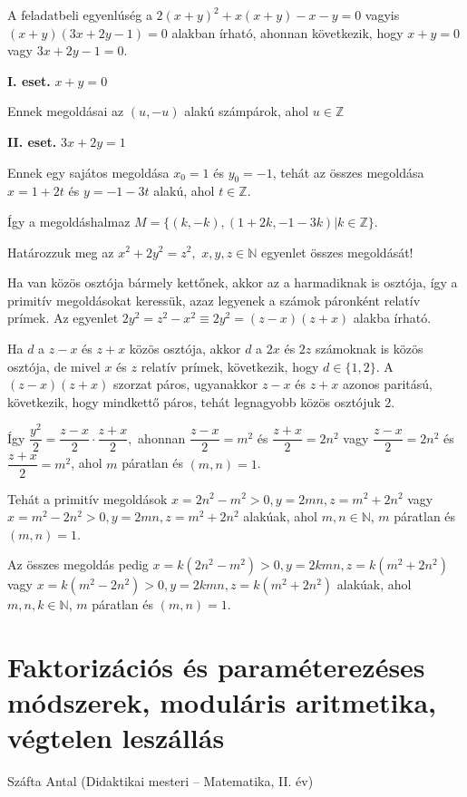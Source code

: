 \begin{solution}
A feladatbeli egyenlúség a $2(x+y)^{2}+x(x+y)-x-y=0$ vagyis $(x+y)(3x+2y-1)=0$
alakban írható, ahonnan következik, hogy $x+y=0$ vagy $3x+2y-1=0.$

\textbf{I. eset.} $x+y=0$

Ennek megoldásai az $(u,-u)$ alakú számpárok, ahol $u\in\mathbb{Z}$

\textbf{II. eset.} $3x+2y=1$

Ennek egy sajátos megoldása $x_{0}=1$ és $y_{0}=-1$, tehát az összes
megoldása $x=1+2t$ és $y=-1-3t$ alakú, ahol $t\in\mathbb{Z}.$

Így a megoldáshalmaz $M=\{(k,-k),(1+2k,-1-3k)|k\in\mathbb{Z}\}.$
\end{solution}
\begin{extraproblem}
Határozzuk meg az $x^{2}+2y^{2}=z^{2},$ $x,y,z\in\mathbb{N}$ egyenlet
összes megoldását! 
\end{extraproblem}

\begin{solution}
Ha van közös osztója bármely kettőnek, akkor az a harmadiknak is osztója,
így a primitív megoldásokat keressük, azaz legyenek a számok páronként
relatív prímek. Az egyenlet $2y^{2}=z^{2}-x^{2}\equiv2y^{2}=(z-x)(z+x)$
alakba írható.

Ha $d$ a $z-x$ és $z+x$ közös osztója, akkor $d$ a $2x$ és $2z$
számoknak is közös osztója, de mivel $x$ és $z$ relatív prímek,
következik, hogy $d\in\{1,2\}$. A $(z-x)(z+x)$ szorzat páros, ugyanakkor
$z-x$ és $z+x$ azonos paritású, következik, hogy mindkettő páros,
tehát legnagyobb közös osztójuk 2.

Így $\dfrac{y^{2}}{2}=\dfrac{z-x}{2}\cdot\dfrac{z+x}{2},$ ahonnan
$\dfrac{z-x}{2}=m^{2}$ és $\dfrac{z+x}{2}=2n^{2}$ vagy $\dfrac{z-x}{2}=2n^{2}$
és $\dfrac{z+x}{2}=m^{2}$, ahol $m$ páratlan és $(m,n)=1$.

Tehát a primitív megoldások $x=2n^{2}-m^{2}>0,y=2mn,z=m^{2}+2n^{2}$
vagy $x=m^{2}-2n^{2}>0,y=2mn,z=m^{2}+2n^{2}$ alakúak, ahol $m,n\in\mathbb{N}$,
$m$ páratlan és $(m,n)=1$.

Az összes megoldás pedig $x=k(2n^{2}-m^{2})>0,y=2kmn,z=k(m^{2}+2n^{2})$
vagy $x=k(m^{2}-2n^{2})>0,y=2kmn,z=k(m^{2}+2n^{2})$ alakúak, ahol
$m,n,k\in\mathbb{N}$, $m$ páratlan és $(m,n)=1$.
\end{solution}

\section{Faktorizációs és paraméterezéses módszerek, moduláris aritmetika, végtelen leszállás}\label{sec:vegtelen_leszallas}
\begin{description}
	{\large \item [{Szerző}] Száfta Antal (Didaktikai mesteri -- Matematika, II. év) }
\end{description}


